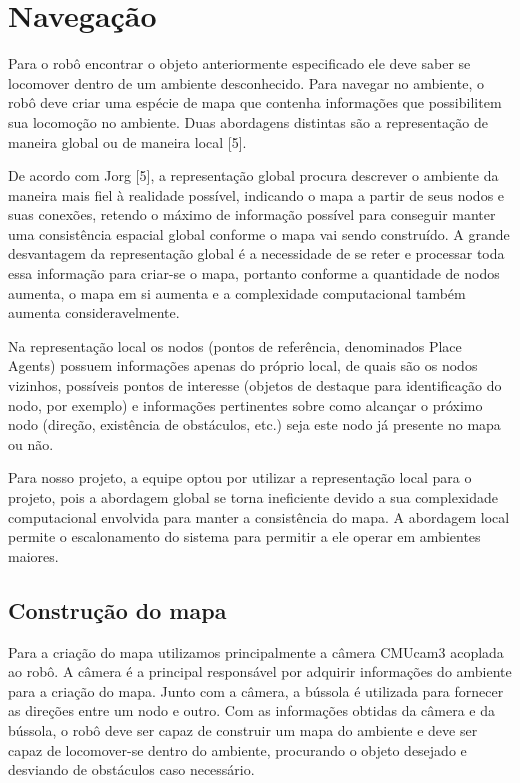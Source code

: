 \chapter{Navegação}

Para o robô encontrar o objeto anteriormente especificado ele deve saber se locomover dentro de um ambiente desconhecido. Para navegar no ambiente, o robô deve criar uma espécie de mapa que contenha informações que possibilitem sua locomoção no ambiente. Duas abordagens distintas são a representação de maneira global ou de maneira local [5].

De acordo com Jorg [5], a representação global procura descrever o ambiente da maneira mais fiel à realidade possível, indicando o mapa a partir de seus nodos e suas conexões, retendo o máximo de informação possível para conseguir manter uma consistência espacial global conforme o mapa vai sendo construído. A grande desvantagem da representação global é a necessidade de se reter e processar toda essa informação para criar-se o mapa, portanto conforme a quantidade de nodos aumenta, o mapa em si aumenta e a complexidade computacional também aumenta consideravelmente.

Na representação local os nodos (pontos de referência, denominados Place Agents) possuem informações apenas do próprio local, de quais são os nodos vizinhos, possíveis pontos de interesse (objetos de destaque para identificação do nodo, por exemplo) e informações pertinentes sobre como alcançar o próximo nodo (direção, existência de obstáculos, etc.) seja este nodo já presente no mapa ou não.

Para nosso projeto, a equipe optou por utilizar a representação local para o projeto, pois a abordagem global se torna ineficiente devido a sua complexidade computacional envolvida para manter a consistência do mapa. A abordagem local permite o escalonamento do sistema para permitir a ele operar em ambientes maiores.

\section{Construção do mapa}

Para a criação do mapa utilizamos principalmente a câmera CMUcam3 acoplada ao robô. A câmera é a principal responsável por adquirir informações do ambiente para a criação do mapa. Junto com a câmera, a bússola é utilizada para fornecer as direções entre um nodo e outro. Com as informações obtidas da câmera e da bússola, o robô deve ser capaz de construir um mapa do ambiente e deve ser capaz de locomover-se dentro do ambiente, procurando o objeto desejado e desviando de obstáculos caso necessário.

